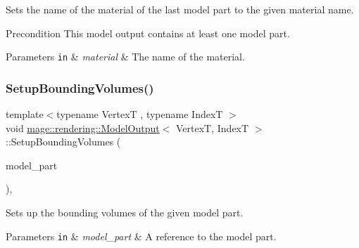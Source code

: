 Sets the name of the material of the last model part to the given material name.

\begin{DoxyPrecond}{Precondition}
This model output contains at least one model part. 
\end{DoxyPrecond}

\begin{DoxyParams}[1]{Parameters}
\mbox{\tt in}  & {\em material} & The name of the material. \\
\hline
\end{DoxyParams}
\mbox{\label{structmage_1_1rendering_1_1_model_output_a4b00228713e34d955cb5104c8592f7a0}} 
\subsubsection{\texorpdfstring{Setup\+Bounding\+Volumes()}{SetupBoundingVolumes()}}
{\footnotesize\ttfamily template$<$typename VertexT , typename IndexT $>$ \\
void \mbox{\hyperlink{structmage_1_1rendering_1_1_model_output}{mage\+::rendering\+::\+Model\+Output}}$<$ VertexT, IndexT $>$\+::Setup\+Bounding\+Volumes (\begin{DoxyParamCaption}\item[{\mbox{\hyperlink{structmage_1_1rendering_1_1_model_part}{Model\+Part}} \&}]{model\+\_\+part }\end{DoxyParamCaption})\hspace{0.3cm}{\ttfamily [private]}, {\ttfamily [noexcept]}}

Sets up the bounding volumes of the given model part.


\begin{DoxyParams}[1]{Parameters}
\mbox{\tt in}  & {\em model\+\_\+part} & A reference to the model part. \\
\hline
\end{DoxyParams}
\mbox{\label{structmage_1_1rendering_1_1_model_output_adc21b44bf476fa7704f97403c1539eb9}} 
